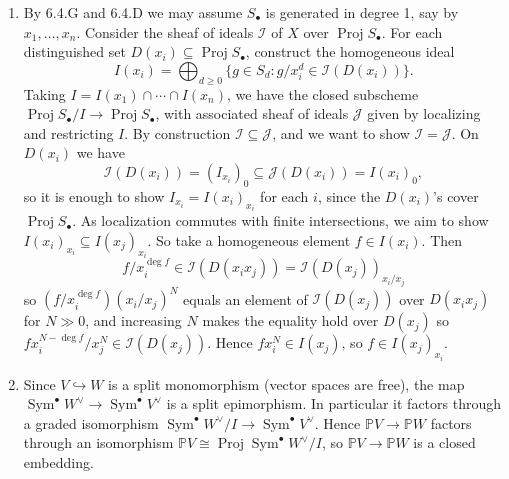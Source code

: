 \documentclass{report}
\newcommand{\dual}{\vee} %
\newcommand{\I}{\mathscr{I}}
\newcommand{\J}{\mathscr{J}}
\renewcommand{\P}{\mathbb{P}} %
\DeclareMathOperator{\Sym}{Sym}
\DeclareMathOperator{\Proj}{Proj}
\begin{document}
\begin{enumerate}[label=\textbf{8.2.\Alph*.}]
	\item By 6.4.G and 6.4.D we may assume $S_\bullet$ is generated in degree 1,
	      say by $x_1,\ldots,x_n$. Consider the sheaf of ideals $\I$ of $X$ over
	      $\Proj S_\bullet$. For each distinguished set
	      $D(x_i)\subseteq\Proj S_\bullet$, construct the homogeneous ideal
	      \begin{equation*}
		      I(x_i) = \bigoplus_{d\ge0}\{g\in S_d:g/x_i^d\in\I(D(x_i))\}.
	      \end{equation*}
	      Taking $I=I(x_1)\cap\cdots\cap I(x_n)$, we have the closed subscheme
	      $\Proj S_\bullet/I\to\Proj S_\bullet$, with associated sheaf of ideals
	      $\J$ given by localizing and restricting $I$. By construction
	      $\I\subseteq\J$, and we want to show $\I=\J$. On $D(x_i)$ we have
	      \begin{equation*}
		      \I(D(x_i)) = (I_{x_i})_0 \subseteq \J(D(x_i)) = I(x_i)_0,
	      \end{equation*}
	      so it is enough to show $I_{x_i}=I(x_i)_{x_i}$ for each $i$, since the
	      $D(x_i)$'s cover $\Proj S_\bullet$. As localization commutes with finite
	      intersections, we aim to show $I(x_i)_{x_i}\subseteq I(x_j)_{x_i}$. So
	      take a homogeneous element $f\in I(x_i)$. Then
	      \begin{equation*}
		      f/x_i^{\deg f}\in\I(D(x_ix_j))=\I(D(x_j))_{x_i/x_j}
	      \end{equation*}
	      so $(f/x_i^{\deg f})(x_i/x_j)^N$ equals an element of $\I(D(x_j))$ over
	      $D(x_ix_j)$ for $N\gg0$, and increasing $N$ makes the equality hold over
	      $D(x_j)$ so $fx_i^{N-\deg f}/x_j^N\in\I(D(x_j))$. Hence
	      $fx_i^N\in I(x_j)$, so $f\in I(x_j)_{x_i}$.

	\item Since $V\hookrightarrow W$ is a split monomorphism (vector spaces are
	      free), the map $\Sym^\bullet W^\dual\to\Sym^\bullet V^\dual$ is a split
	      epimorphism. In particular it factors through a graded isomorphism
	      $\Sym^\bullet W^\dual/I\to\Sym^\bullet V^\dual$. Hence $\P V\to\P W$
	      factors through an isomorphism $\P V\cong\Proj\Sym^\bullet W^\dual/I$,
	      so $\P V\to\P W$ is a closed embedding.


\end{enumerate}
\end{document}
